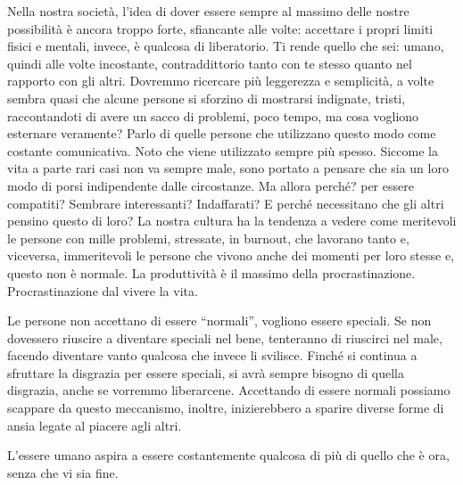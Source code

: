 \documentclass[12pt]{book} %
\begin{document}
\bigskip

Nella nostra società, l'idea di dover essere sempre al massimo delle nostre possibilità è ancora
troppo forte, sfiancante alle volte: accettare i propri limiti fisici e mentali, invece, è qualcosa di liberatorio. Ti
rende quello che sei: umano, quindi alle volte incostante, contraddittorio tanto con te stesso quanto nel rapporto con
gli altri. Dovremmo ricercare più
leggerezza e semplicità, a volte sembra quasi che alcune persone si sforzino di mostrarsi indignate, tristi,
raccontandoti di avere un sacco di problemi, poco tempo, ma cosa vogliono esternare veramente? Parlo di quelle persone
che utilizzano questo modo come costante comunicativa. Noto che viene utilizzato sempre più spesso. Siccome la vita
a parte rari casi non va sempre male, sono portato a pensare che sia un loro modo di porsi indipendente dalle
circostanze. Ma allora perché? per essere compatiti? Sembrare interessanti? Indaffarati? E perché necessitano che gli
altri pensino questo di loro? La nostra cultura ha la tendenza a vedere come meritevoli le persone con mille problemi,
stressate, in burnout, che lavorano tanto e, viceversa, immeritevoli le persone che vivono anche dei momenti per loro
stesse e, questo non è normale. La produttività è il massimo della procrastinazione. Procrastinazione dal vivere la vita.

Le persone non accettano di essere “normali”, vogliono essere speciali. Se non dovessero riuscire a diventare speciali
nel bene, tenteranno di riuscirci nel male, facendo diventare vanto qualcosa che invece li svilisce. Finché si
continua a sfruttare la disgrazia per essere speciali, si avrà sempre bisogno di quella disgrazia, anche se vorremmo
liberarcene. Accettando di essere normali possiamo scappare da questo meccanismo, inoltre, inizierebbero a sparire
diverse forme di ansia legate al piacere agli altri. 

L'essere umano aspira a essere costantemente qualcosa di più di quello che è ora, senza che vi sia fine.
\end{document}
